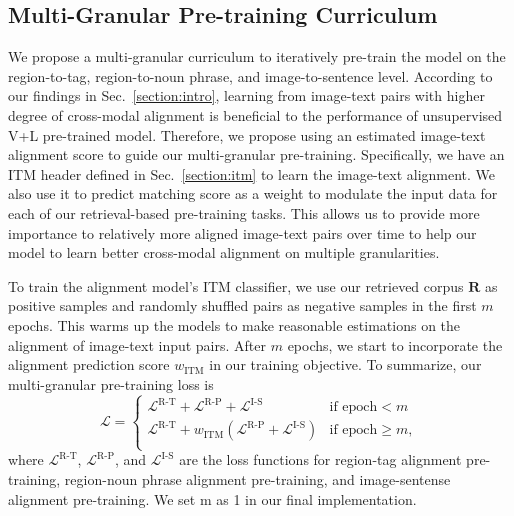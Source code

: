 \subsection{Multi-Granular Pre-training Curriculum}
We propose a multi-granular curriculum to iteratively pre-train the model on the region-to-tag, region-to-noun phrase, and image-to-sentence level. 
According to our findings in Sec.~\ref{section:intro}, learning from image-text pairs with higher degree of cross-modal alignment is beneficial to the performance of unsupervised V+L pre-trained model. 
Therefore, we propose using an estimated image-text alignment score to guide our multi-granular pre-training. 
Specifically, we have an ITM header defined in Sec.~\ref{section:itm} to learn the image-text alignment. 
We also use it to predict matching score as a weight to modulate the input data for each of our retrieval-based pre-training tasks. 
This allows us to provide more importance to relatively more aligned image-text pairs over time to help our model to learn better cross-modal alignment on multiple granularities. 

To train the alignment model's ITM classifier, we use our retrieved corpus $\mathbf{R}$ as positive samples and randomly shuffled pairs as negative samples in the first $m$ epochs. This warms up the models to make reasonable estimations on the alignment of image-text input pairs.
After $m$ epochs, we start to incorporate the alignment prediction score $w_{\text{ITM}}$ in our training objective. 
To summarize, our multi-granular pre-training loss is 
\begin{equation}\nonumber
\mathcal{L}=  
\begin{cases}
      \mathcal{L}^{\text{R-T}} + \mathcal{L}^{\text{R-P}} +\mathcal{L}^{\text{I-S}}   &\text{if epoch} < m\\ 
      \mathcal{L}^{\text{R-T}} + w_{\text{ITM}} (\mathcal{L}^{\text{R-P}}  +  \mathcal{L}^{\text{I-S}}) &\text{if epoch} \geq m, \\
    \end{cases}
\end{equation}
where $\mathcal{L}^{\text{R-T}}$, $\mathcal{L}^{\text{R-P}}$, and $\mathcal{L}^{\text{I-S}}$ are the loss functions for region-tag alignment pre-training, region-noun phrase alignment pre-training, and image-sentense alignment pre-training. We set m as 1 in our final implementation.
